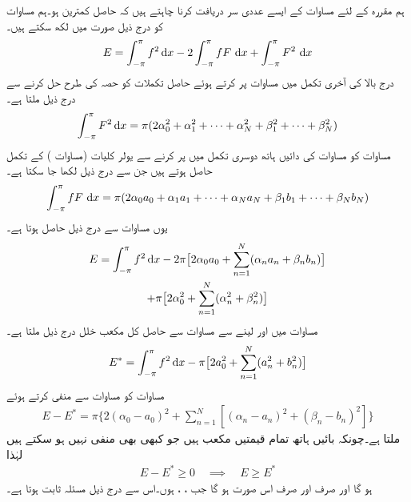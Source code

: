 ہم مقررہ  کے لئے مساوات  کے ایسے عددی سر دریافت کرنا چاہتے ہیں کہ حاصل  کمترین ہو۔ہم مساوات  کو درج ذیل صورت میں لکھ سکتے ہیں۔
\begin{align}\label{مساوات_فوریئر_تقریب_ت}
E=\int_{-\pi}^{\pi} f^2\dif x-2\int_{-\pi}^{\pi} fF\,\dif x+\int_{-\pi}^{\pi} F^2\,\dif x
\end{align}
درج بالا کی آخری تکمل میں مساوات  پر کرتے ہوئے حاصل تکملات کو حصہ  کی طرح حل کرنے سے درج ذیل ملتا ہے۔ 
\begin{align*}
\int_{-\pi}^{\pi} F^2\dif x=\pi(2\alpha_0^2+\alpha_1^2+\cdots+\alpha_N^2+\beta_1^2+\cdots+\beta_N^2)
\end{align*}
مساوات  کو  مساوات  کی دائیں ہاتھ دوسری تکمل میں پر کرنے سے   یولر کلیات (مساوات ) کے تکمل حاصل ہوتے ہیں جن سے درج ذیل لکھا جا سکتا ہے۔
\begin{align*}
\int_{-\pi}^{\pi} fF\,\dif x=\pi(2\alpha_0a_0+\alpha_1a_1+\cdots+\alpha_Na_N+\beta_1b_1+\cdots+\beta_Nb_N)
\end{align*}
یوں مساوات  سے درج ذیل حاصل ہوتا ہے۔
\begin{multline}\label{مساوات_فوریئر_تقریب_ٹ}
E=\int_{-\pi}^{\pi} f^2\dif x-2\pi\big[2\alpha_0a_0+\sum\limits_{n=1}^{N}(\alpha_na_n+\beta_nb_n)\big]\\
+\pi\big[2\alpha_0^2+\sum\limits_{n=1}^{N}(\alpha_n^2+\beta_n^2)\big]
\end{multline}
مساوات  میں  اور  لینے سے  مساوات  سے حاصل کل مکعب خلل درج ذیل ملتا ہے۔
\begin{align}\label{مساوات_فوریئر_تقریب_ث}
E^*=\int_{-\pi}^{\pi} f^2\dif x-\pi\big[2a_0^2+\sum\limits_{n=1}^{N}(a_n^2+b_n^2)\big]
\end{align}
مساوات  کو مساوات  سے منفی کرتے ہوئے
\begin{align*}
E-E^*=\pi\big\{2(\alpha_0-a_0)^2+\sum\limits_{n=1}^{N}[(\alpha_n-a_n)^2+(\beta_n-b_n)^2]\big\}
\end{align*}
ملتا ہے۔چونکہ بائیں ہاتھ تمام قیمتیں مکعب ہیں جو کبھی بھی منفی نہیں ہو سکتے ہیں لہٰذا 
\begin{align*}
E-E^*\ge 0\quad \implies \quad E\ge E^*
\end{align*}
ہو گا اور  صرف اور صرف اس صورت ہو گا جب ، ،  ہوں۔اس سے درج ذیل مسئلہ ثابت ہوتا ہے۔


